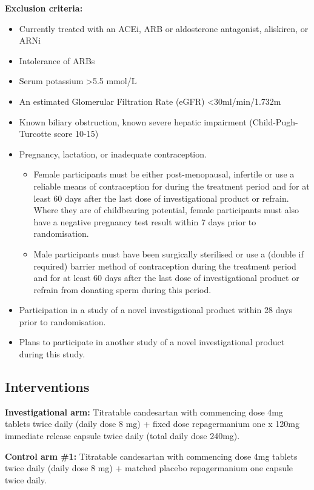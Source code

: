 \documentclass[11pt,parskip=full-]{scrartcl}
\begin{document}
\textbf{Exclusion criteria:}
\begin{itemize}
    \item Currently treated with an ACEi, ARB or aldosterone antagonist, aliskiren, or ARNi
    \item Intolerance of ARBs
    \item Serum potassium >5.5 mmol/L
    \item An estimated Glomerular Filtration Rate (eGFR) <30ml/min/1.732m
    \item Known biliary obstruction, known severe hepatic impairment (Child-Pugh-Turcotte score 10-15)
    \item Pregnancy, lactation, or inadequate contraception.
    \begin{itemize}
        \item Female participants must be either post-menopausal, infertile or use a reliable means of contraception for during the treatment period and for at least 60 days after the last dose of investigational product or refrain. Where they are of childbearing potential, female participants must also have a negative pregnancy test result within 7 days prior to randomisation.
        \item Male participants must have been surgically sterilised or use a (double if required) barrier method of contraception during the treatment period and for at least 60 days after the last dose of investigational product or refrain from donating sperm during this period.
    \end{itemize}
    \item Participation in a study of a novel investigational product within 28 days prior to randomisation.
    \item Plans to participate in another study of a novel investigational product during this study.
\end{itemize}

\subsection{Interventions}
\textbf{Investigational arm:} Titratable candesartan with commencing dose 4mg tablets twice daily (daily dose 8 mg) + fixed dose repagermanium one x 120mg immediate release capsule twice daily (total daily dose 240mg).

\textbf{Control arm \#1:} Titratable candesartan with commencing dose 4mg tablets twice daily (daily dose 8 mg) + matched placebo repagermanium one capsule twice daily.
\end{document}
